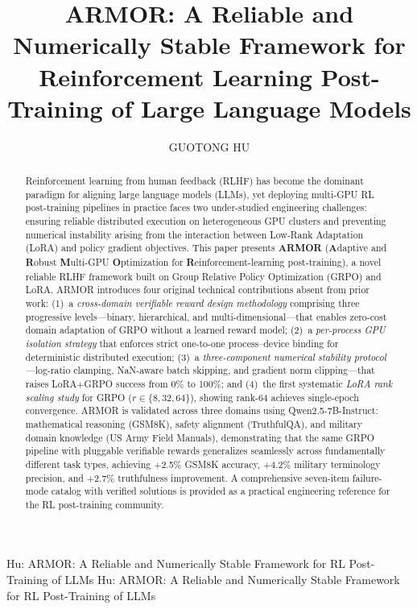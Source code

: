 \documentclass{ieeeaccess}
\begin{document}

\title{ARMOR: A Reliable and Numerically Stable Framework for Reinforcement Learning Post-Training of Large Language Models}
\author{\uppercase{Guotong Hu}}
\address[1]{University of Electronic Science and Technology of China (UESTC), Chengdu 611731, China (e-mail: guotong.hu@uestc.edu.cn)}

\markboth
{Hu: ARMOR: A Reliable and Numerically Stable Framework for RL Post-Training of LLMs}
{Hu: ARMOR: A Reliable and Numerically Stable Framework for RL Post-Training of LLMs}


\begin{abstract}
Reinforcement learning from human feedback (RLHF) has become the dominant paradigm for aligning
large language models (LLMs), yet deploying multi-GPU RL post-training pipelines in practice
faces two under-studied engineering challenges: ensuring reliable distributed execution on
heterogeneous GPU clusters and preventing numerical instability arising from the interaction
between Low-Rank Adaptation (LoRA) and policy gradient objectives.
This paper presents \textbf{ARMOR} (\textbf{A}daptive and \textbf{R}obust \textbf{M}ulti-GPU
\textbf{O}ptimization for \textbf{R}einforcement-learning post-training), a novel reliable RLHF
framework built on Group Relative Policy Optimization (GRPO) and LoRA.
ARMOR introduces four original technical contributions absent from prior work:
(1)~a \textit{cross-domain verifiable reward design methodology} comprising
three progressive levels---binary, hierarchical, and multi-dimensional---that
enables zero-cost domain adaptation of GRPO without a learned reward model;
(2)~a \textit{per-process GPU isolation strategy} that enforces strict
one-to-one process--device binding for deterministic distributed execution;
(3)~a \textit{three-component numerical stability protocol}---log-ratio
clamping, NaN-aware batch skipping, and gradient norm clipping---that raises
LoRA+GRPO success from 0\% to 100\%; and
(4)~the first systematic \textit{LoRA rank scaling study} for GRPO
($r\in\{8,32,64\}$), showing rank-64 achieves single-epoch convergence.
ARMOR is validated across three domains using Qwen2.5-7B-Instruct:
mathematical reasoning (GSM8K), safety alignment (TruthfulQA), and
military domain knowledge (US Army Field Manuals), demonstrating that
the same GRPO pipeline with pluggable verifiable rewards generalizes
seamlessly across fundamentally different task types,
achieving +2.5\% GSM8K accuracy, +4.2\% military terminology precision,
and +2.7\% truthfulness improvement.
A comprehensive seven-item failure-mode catalog with verified solutions is provided
as a practical engineering reference for the RL post-training community.
\end{abstract}
\end{document}
